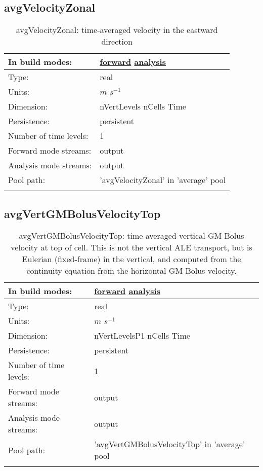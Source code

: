 \subsection[avgVelocityZonal]{avgVelocityZonal}
\label{subsec:var_sec_average_avgVelocityZonal}
\begin{center}
\begin{longtable}{| p{2.0in} | p{4.0in} |}
        \hline 
        In build modes: & \hyperref[subsec:forward_var_tab_average]{forward} \hyperref[subsec:analysis_var_tab_average]{analysis} \\
        \hline 
        Type: & real \\
        \hline 
        Units: & $m$ $s^{-1}$ \\
        \hline 
        Dimension: & nVertLevels nCells Time \\
        \hline 
        Persistence: & persistent \\
        \hline 
        Number of time levels: & 1 \\
        \hline 
		 Forward mode streams: &  output \\
        \hline 
		 Analysis mode streams: &  output \\
        \hline 
            Pool path: & 'avgVelocityZonal' in 'average' pool
 \\
		 \hline 
    \caption{avgVelocityZonal: time-averaged velocity in the eastward direction}
\end{longtable}
\end{center}
\subsection[avgVertGMBolusVelocityTop]{avgVertGMBolusVelocityTop}
\label{subsec:var_sec_average_avgVertGMBolusVelocityTop}
\begin{center}
\begin{longtable}{| p{2.0in} | p{4.0in} |}
        \hline 
        In build modes: & \hyperref[subsec:forward_var_tab_average]{forward} \hyperref[subsec:analysis_var_tab_average]{analysis} \\
        \hline 
        Type: & real \\
        \hline 
        Units: & $m$ $s^{-1}$ \\
        \hline 
        Dimension: & nVertLevelsP1 nCells Time \\
        \hline 
        Persistence: & persistent \\
        \hline 
        Number of time levels: & 1 \\
        \hline 
		 Forward mode streams: &  output \\
        \hline 
		 Analysis mode streams: &  output \\
        \hline 
            Pool path: & 'avgVertGMBolusVelocityTop' in 'average' pool
 \\
		 \hline 
    \caption{avgVertGMBolusVelocityTop: time-averaged vertical GM Bolus velocity at top of cell.  This is not the vertical ALE transport, but is Eulerian (fixed-frame) in the vertical, and computed from the continuity equation from the horizontal GM Bolus velocity.}
\end{longtable}
\end{center}
